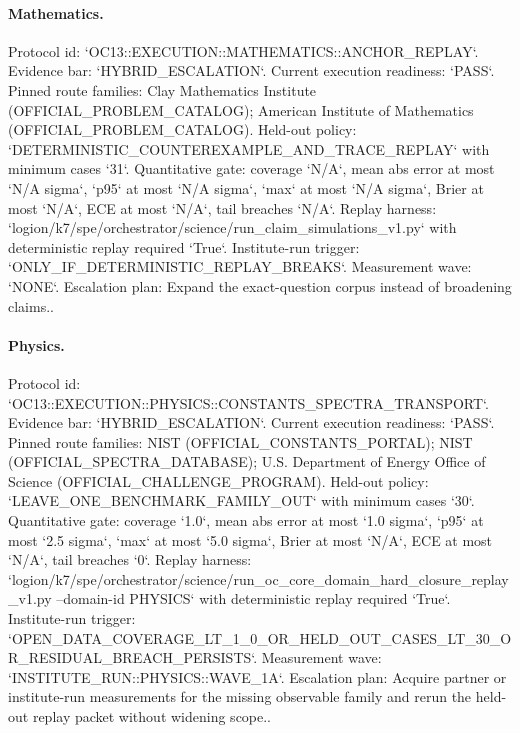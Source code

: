 \paragraph{Mathematics.}
Protocol id: `OC13::EXECUTION::MATHEMATICS::ANCHOR\_REPLAY`. Evidence bar: `HYBRID\_ESCALATION`. Current execution readiness: `PASS`.
Pinned route families: Clay Mathematics Institute (OFFICIAL\_PROBLEM\_CATALOG); American Institute of Mathematics (OFFICIAL\_PROBLEM\_CATALOG).
Held-out policy: `DETERMINISTIC\_COUNTEREXAMPLE\_AND\_TRACE\_REPLAY` with minimum cases `31`.
Quantitative gate: coverage `N/A`, mean abs error at most `N/A sigma`, `p95` at most `N/A sigma`, `max` at most `N/A sigma`, Brier at most `N/A`, ECE at most `N/A`, tail breaches `N/A`.
Replay harness: `logion/k7/spe/orchestrator/science/run\_claim\_simulations\_v1.py` with deterministic replay required `True`.
Institute-run trigger: `ONLY\_IF\_DETERMINISTIC\_REPLAY\_BREAKS`. Measurement wave: `NONE`.
Escalation plan: Expand the exact-question corpus instead of broadening claims..

\paragraph{Physics.}
Protocol id: `OC13::EXECUTION::PHYSICS::CONSTANTS\_SPECTRA\_TRANSPORT`. Evidence bar: `HYBRID\_ESCALATION`. Current execution readiness: `PASS`.
Pinned route families: NIST (OFFICIAL\_CONSTANTS\_PORTAL); NIST (OFFICIAL\_SPECTRA\_DATABASE); U.S. Department of Energy Office of Science (OFFICIAL\_CHALLENGE\_PROGRAM).
Held-out policy: `LEAVE\_ONE\_BENCHMARK\_FAMILY\_OUT` with minimum cases `30`.
Quantitative gate: coverage `1.0`, mean abs error at most `1.0 sigma`, `p95` at most `2.5 sigma`, `max` at most `5.0 sigma`, Brier at most `N/A`, ECE at most `N/A`, tail breaches `0`.
Replay harness: `logion/k7/spe/orchestrator/science/run\_oc\_core\_domain\_hard\_closure\_replay\_v1.py --domain-id PHYSICS` with deterministic replay required `True`.
Institute-run trigger: `OPEN\_DATA\_COVERAGE\_LT\_1\_0\_OR\_HELD\_OUT\_CASES\_LT\_30\_OR\_RESIDUAL\_BREACH\_PERSISTS`. Measurement wave: `INSTITUTE\_RUN::PHYSICS::WAVE\_1A`.
Escalation plan: Acquire partner or institute-run measurements for the missing observable family and rerun the held-out replay packet without widening scope..

